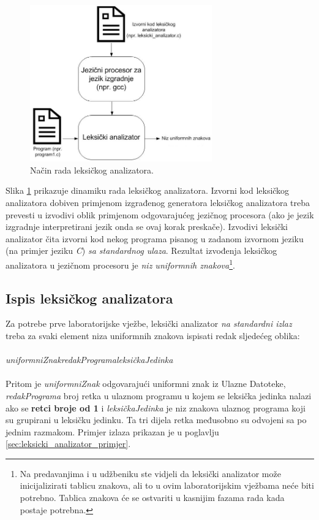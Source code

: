 \documentclass[times, 12pt, utf8]{book}
\begin{document}
\begin{figure}[htb!]
\centering
\includegraphics[width=0.7\textwidth]{slike/leksicki-analizator.jpg}
\caption{Način rada leksičkog analizatora.}
\label{fig:leksicki-analizator}
\end{figure}

Slika \ref{fig:leksicki-analizator} prikazuje dinamiku rada leksičkog analizatora.
Izvorni kod leksičkog analizatora dobiven primjenom izgrađenog generatora leksičkog analizatora treba prevesti u izvodivi oblik primjenom odgovarajućeg jezičnog procesora (ako je jezik izgradnje interpretirani jezik onda se ovaj korak preskače).
Izvodivi leksički analizator čita izvorni kod nekog programa pisanog u zadanom izvornom jeziku (na primjer jeziku \emph{C}) \emph{sa standardnog ulaza}.
Rezultat izvođenja leksičkog analizatora u jezičnom procesoru je \emph{niz uniformnih znakova}\footnote{Na predavanjima i u udžbeniku ste vidjeli da leksički analizator može inicijalizirati tablicu znakova, ali to u ovim laboratorijskim vježbama neće biti potrebno. Tablica znakova će se ostvariti u kasnijim fazama rada kada postaje potrebna.}.

\subsection{Ispis leksičkog analizatora}
Za potrebe prve laboratorijske vježbe, leksički analizator \emph{na standardni izlaz} treba za svaki element niza uniformnih znakova ispisati redak sljedećeg oblika:\\
\\
\emph{uniformniZnak}\textvisiblespace\emph{redakPrograma}\textvisiblespace\emph{leksičkaJedinka}\\
\\
Pritom je \emph{uniformniZnak} odgovarajući uniformni znak iz Ulazne Datoteke, \emph{redakPrograma} broj retka u ulaznom programu u kojem se leksička jedinka nalazi ako se \textbf{retci broje od 1} i \emph{leksičkaJedinka} je niz znakova ulaznog programa koji su grupirani u leksičku jedinku.
Ta tri dijela retka međusobno su odvojeni sa po jednim razmakom.
Primjer izlaza prikazan je u poglavlju \ref{sec:leksicki_analizator_primjer}.
\end{document}
